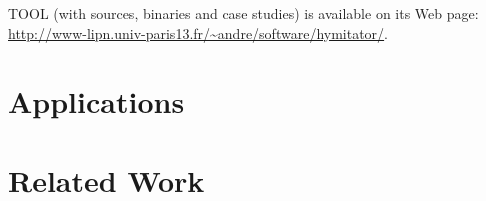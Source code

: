 \documentclass{llncs}
\begin{document}
TOOL (with sources, binaries and case studies) is available on its Web page: \url{http://www-lipn.univ-paris13.fr/~andre/software/hymitator/}.



\section{Applications}


\section{Related Work}



\end{document}
